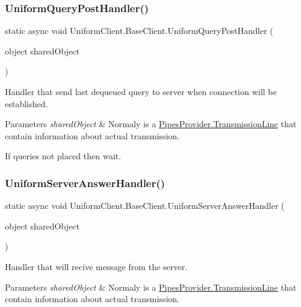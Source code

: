 \subsubsection{\texorpdfstring{Uniform\+Query\+Post\+Handler()}{UniformQueryPostHandler()}}
{\footnotesize\ttfamily static async void Uniform\+Client.\+Base\+Client.\+Uniform\+Query\+Post\+Handler (\begin{DoxyParamCaption}\item[{object}]{shared\+Object }\end{DoxyParamCaption})\hspace{0.3cm}{\ttfamily [static]}}



Handler that send last dequeued query to server when connection will be established. 


\begin{DoxyParams}{Parameters}
{\em shared\+Object} & Normaly is a \mbox{\hyperlink{class_pipes_provider_1_1_transmission_line}{Pipes\+Provider.\+Transmission\+Line}} that contain information about actual transmission.\\
\hline
\end{DoxyParams}
If queries not placed then wait. \mbox{\label{class_uniform_client_1_1_base_client_af7a3c613846c8595431272c4c9d531f3}} 
\subsubsection{\texorpdfstring{Uniform\+Server\+Answer\+Handler()}{UniformServerAnswerHandler()}}
{\footnotesize\ttfamily static async void Uniform\+Client.\+Base\+Client.\+Uniform\+Server\+Answer\+Handler (\begin{DoxyParamCaption}\item[{object}]{shared\+Object }\end{DoxyParamCaption})\hspace{0.3cm}{\ttfamily [static]}}



Handler that will recive message from the server. 


\begin{DoxyParams}{Parameters}
{\em shared\+Object} & Normaly is a \mbox{\hyperlink{class_pipes_provider_1_1_transmission_line}{Pipes\+Provider.\+Transmission\+Line}} that contain information about actual transmission.\\
\hline
\end{DoxyParams}


